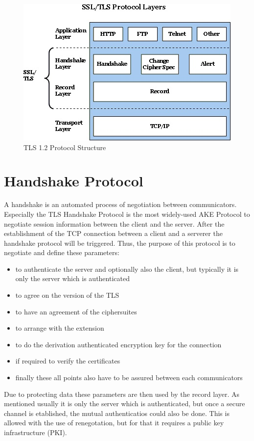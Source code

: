 \begin{figure}[H]
	\centering
		\includegraphics[scale=1]{images/tls_structure.jpg}
	\caption{TLS 1.2 Protocol Structure \cite{ms:overview}}
	\label{fig:tls_structure}
\end{figure}

\section{Handshake Protocol}
\label{sec:handshake_protocol}
A handshake is an automated process of negotiation between communicators. Especially the TLS Handshake Protocol is the most widely-used  AKE Protocol to negotiate session information between the client and the server. 
After the establishment of the TCP connection between a client and a serverer the handshake protocol will be triggered. 
Thus, the purpose of this protocol is to negotiate and define these parameters:
 
 \begin{itemize}
\item to authenticate the server and optionally also the client, but typically it is only the server which is authenticated
 \item to agree on the version of the TLS
 \item to have an agreement of the ciphersuites
 \item to arrange with the extension
 \item to do the derivation authenticated encryption key for the connection
 \item if required to verify the certificates
 \item finally these all points also have to be assured between each communicators
\end{itemize}

Due to protecting data these parameters are then used by the record layer. As mentioned usually it is only the server which is authenticated, but once a secure channel is etablished, the mutual authenticatios could also be done. This is allowed with the use of renegotation, but for that it requires a public key infrastructure (PKI). 
\cite{ms:overview}
\cite{ms:handshake}

